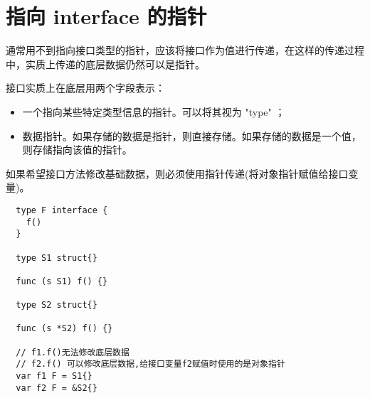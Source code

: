 \section{指向 interface 的指针}
通常用不到指向接口类型的指针，应该将接口作为值进行传递，在这样的传递过程中，实质上传递的底层数据仍然可以是指针。

接口实质上在底层用两个字段表示：
\begin{itemize}[leftmargin=4em]
\item 一个指向某些特定类型信息的指针。可以将其视为 "type" ；
\item 数据指针。如果存储的数据是指针，则直接存储。如果存储的数据是一个值，则存储指向该值的指针。
\end{itemize}

如果希望接口方法修改基础数据，则必须使用指针传递(将对象指针赋值给接口变量)。
\begin{verbatim}
  type F interface {
  	f()
  }

  type S1 struct{}

  func (s S1) f() {}

  type S2 struct{}

  func (s *S2) f() {}

  // f1.f()无法修改底层数据
  // f2.f() 可以修改底层数据,给接口变量f2赋值时使用的是对象指针
  var f1 F = S1{}
  var f2 F = &S2{}
\end{verbatim}
